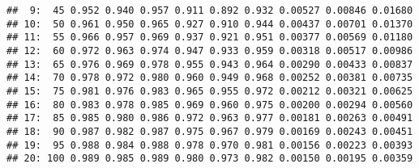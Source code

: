 \documentclass{article}\usepackage[]{graphicx}\usepackage[]{color}
\makeatletter
\newenvironment{kframe}{%
 \def\at@end@of@kframe{}%
 \ifinner\ifhmode%
  \def\at@end@of@kframe{\end{minipage}}%
  \begin{minipage}{\columnwidth}%
 \fi\fi%
 \def\FrameCommand##1{\hskip\@totalleftmargin \hskip-\fboxsep
 \colorbox{shadecolor}{##1}\hskip-\fboxsep
     \hskip-\linewidth \hskip-\@totalleftmargin \hskip\columnwidth}%
 \MakeFramed {\advance\hsize-\width
   \@totalleftmargin\z@ \linewidth\hsize
   \@setminipage}}%
 {\par\unskip\endMakeFramed%
 \at@end@of@kframe}
\newenvironment{knitrout}{}{} %
\makeatother
\begin{document}
\begin{knitrout}
\begin{kframe}
\begin{verbatim}
##  9:  45 0.952 0.940 0.957 0.911 0.892 0.932 0.00527 0.00846 0.01680
## 10:  50 0.961 0.950 0.965 0.927 0.910 0.944 0.00437 0.00701 0.01370
## 11:  55 0.966 0.957 0.969 0.937 0.921 0.951 0.00377 0.00569 0.01180
## 12:  60 0.972 0.963 0.974 0.947 0.933 0.959 0.00318 0.00517 0.00986
## 13:  65 0.976 0.969 0.978 0.955 0.943 0.964 0.00290 0.00433 0.00837
## 14:  70 0.978 0.972 0.980 0.960 0.949 0.968 0.00252 0.00381 0.00735
## 15:  75 0.981 0.976 0.983 0.965 0.955 0.972 0.00212 0.00321 0.00625
## 16:  80 0.983 0.978 0.985 0.969 0.960 0.975 0.00200 0.00294 0.00560
## 17:  85 0.985 0.980 0.986 0.972 0.963 0.977 0.00181 0.00263 0.00491
## 18:  90 0.987 0.982 0.987 0.975 0.967 0.979 0.00169 0.00243 0.00451
## 19:  95 0.988 0.984 0.988 0.978 0.970 0.981 0.00156 0.00223 0.00393
## 20: 100 0.989 0.985 0.989 0.980 0.973 0.982 0.00150 0.00195 0.00359
\end{verbatim}
\end{kframe}
\end{knitrout}
\end{document}
